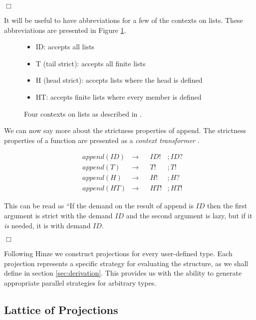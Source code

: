 \hfill$\Box$

It will be useful to have abbreviations for a few of the contexts on lists. These
abbreviations are presented in Figure \ref{fig:listContexts}.

\begin{figure}[t]
\begin{itemize}
    \item[] \<ID\>: accepts all lists
    \item[] \<T\> (tail strict): accepts all finite lists
    \item[] \<H\> (head strict): accepts lists where the head is defined
    \item[] \<HT\>: accepts finite lists where every member is defined
\end{itemize}
\caption[Projections for the 4-point Domain]{Four contexts on lists as described in \citep{wadler1987projections}.}
\label{fig:listContexts}
\end{figure}

We can now say more about the strictness properties of \<append\>. The
strictness properties of a function are presented as a \emph{context
transformer} \citep{hinze1995projection}. 

\begin{align*}
    &append(ID) &\rightarrow &&ID!&;ID? \\
    &append(T)  &\rightarrow &&T!&;T! \\
    &append(H)  &\rightarrow &&H!&;H? \\
    &append(HT) &\rightarrow &&HT!&;HT!
\end{align*}

This can be read as ``If the demand on the result of \<append\> is $ID$
then the first argument is strict with the demand $ID$ and the second
argument is lazy, but if it \emph{is} needed, it is with demand $ID$.

\hfill$\Box$

Following Hinze \citep{hinze1995projection} we construct projections
for every user-defined type. Each projection represents a
specific strategy for evaluating the structure, as we shall define in section
\ref{sec:derivation}. This provides us with the ability to generate
appropriate parallel strategies for arbitrary types.

\subsection{Lattice of Projections}

